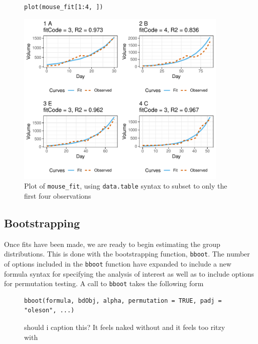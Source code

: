 \documentclass{article}
\newcommand{\xt}{\texttt}%
\begin{document}
\begin{singlespace}
\begin{figure}[H]
\centering
\begin{BVerbatim}
plot(mouse_fit[1:4, ])
\end{BVerbatim}
\end{figure}
\end{singlespace}

\begin{figure}[H]
\centering
\includegraphics[width=0.9\textwidth]{img/mouse_fit.pdf}
\caption{Plot of \xt{mouse\_fit}, using \xt{data.table} syntax to subset to only the first four observations}
\label{fig:plot_fits}
\end{figure}

\subsection{Bootstrapping}

Once fits have been made, we are ready to begin estimating the group distributions. This is done with the bootstrapping function, \xt{bboot}. The number of options included in the \xt{bboot} function have expanded to include a new formula syntax for specifying the analysis of interest as well as to include options for permutation testing. A call to \xt{bboot} takes the following form

\begin{singlespace}
\begin{figure}[H]
\centering
\begin{BVerbatim}
bboot(formula, bdObj, alpha, permutation = TRUE, padj = "oleson", ...)
\end{BVerbatim}
\caption{should i caption this? It feels naked without and it feels too ritzy with}
\end{figure}
\end{singlespace}
\end{document}

